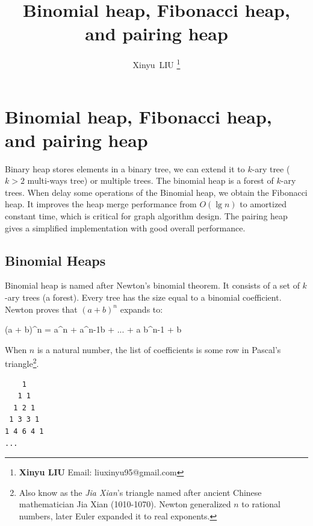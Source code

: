 \documentclass[b5paper]{article}
\begin{document}
\title{Binomial heap, Fibonacci heap, and pairing heap}

\author{Xinyu~LIU
\thanks{{\bfseries Xinyu LIU} \newline
  Email: liuxinyu95@gmail.com \newline}
  }

\maketitle
\fi


\ifx\wholebook\relax
\chapter{Binomial heap, Fibonacci heap, and pairing heap}
\fi

Binary heap stores elements in a binary tree, we can extend it to $k$-ary tree\cite{K-ary-tree} ($k > 2$ multi-ways tree) or multiple trees. The binomial heap is a forest of $k$-ary trees. When delay some operations of the Binomial heap, we obtain the Fibonacci heap. It improves the heap merge performance from $O(\lg n)$ to amortized constant time, which is critical for graph algorithm design. The pairing heap gives a simplified implementation with good overall performance.

\section{Binomial Heaps}
\label{sec:binomial-heap} 

Binomial heap is named after Newton's binomial theorem. It consists of a set of $k$-ary trees (a forest). Every tree has the size equal to a binomial coefficient. Newton proves that $(a + b)^n$ expands to:

\be
(a + b)^n = a^n +  a^{n-1}b + ... +  a b^{n-1} + b
\ee

When $n$ is a natural number, the list of coefficients is some row in Pascal's triangle\footnote{Also know as the {\em Jia Xian}'s triangle named after ancient Chinese mathematician Jia Xian (1010-1070). Newton generalized $n$ to rational numbers, later Euler expanded it to real exponents.}\cite{wiki-pascal-triangle}.

\begin{center}
\begin{BVerbatim}
    1
   1 1
  1 2 1
 1 3 3 1
1 4 6 4 1
...
\end{BVerbatim}
\end{center}
\end{document}
